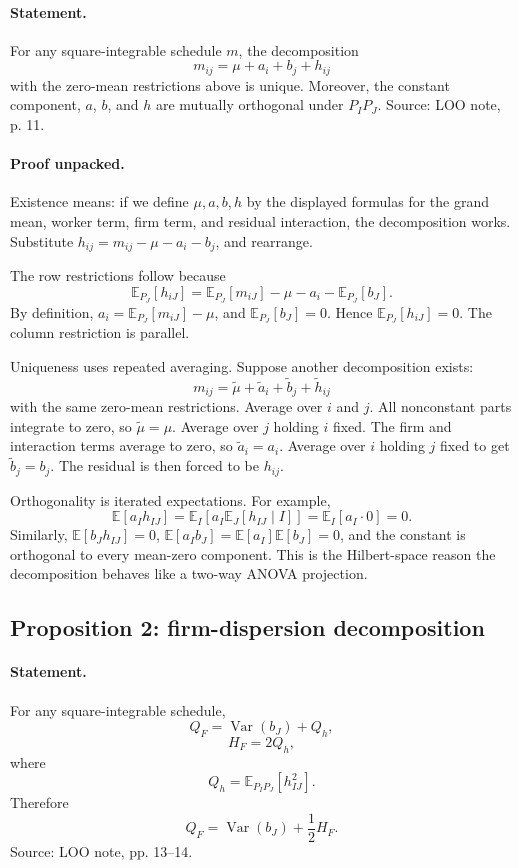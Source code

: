 \documentclass[11pt]{article}
\newcommand{\E}{\mathbb{E}}
\newcommand{\Var}{\operatorname{Var}}
\begin{document}
\paragraph{Statement.}
For any square-integrable schedule \(m\), the decomposition
\[
m_{ij}=\mu+a_i+b_j+h_{ij}
\]
with the zero-mean restrictions above is unique. Moreover, the constant
component, \(a\), \(b\), and \(h\) are mutually orthogonal under \(P_I P_J\).
Source: LOO note, p. 11.

\paragraph{Proof unpacked.}
Existence means: if we define \(\mu,a,b,h\) by the displayed formulas for the
grand mean, worker term, firm term, and residual interaction, the
decomposition works. Substitute \(h_{ij}=m_{ij}-\mu-a_i-b_j\), and rearrange.

The row restrictions follow because
\[
\E_{P_J}[h_{iJ}]
=
\E_{P_J}[m_{iJ}]-\mu-a_i-\E_{P_J}[b_J].
\]
By definition, \(a_i=\E_{P_J}[m_{iJ}]-\mu\), and
\(\E_{P_J}[b_J]=0\). Hence \(\E_{P_J}[h_{iJ}]=0\). The column restriction is
parallel.

Uniqueness uses repeated averaging. Suppose another decomposition exists:
\[
m_{ij}=\tilde\mu+\tilde a_i+\tilde b_j+\tilde h_{ij}
\]
with the same zero-mean restrictions. Average over \(i\) and \(j\). All
nonconstant parts integrate to zero, so \(\tilde\mu=\mu\). Average over \(j\)
holding \(i\) fixed. The firm and interaction terms average to zero, so
\(\tilde a_i=a_i\). Average over \(i\) holding \(j\) fixed to get
\(\tilde b_j=b_j\). The residual is then forced to be \(h_{ij}\).

Orthogonality is iterated expectations. For example,
\[
\E[a_I h_{IJ}]
=
\E_I\left[a_I \E_J[h_{IJ}\mid I]\right]
=
\E_I[a_I\cdot 0]
=0.
\]
Similarly, \(\E[b_J h_{IJ}]=0\), \(\E[a_I b_J]=\E[a_I]\E[b_J]=0\), and the
constant is orthogonal to every mean-zero component. This is the Hilbert-space
reason the decomposition behaves like a two-way ANOVA projection.

\subsection{Proposition 2: firm-dispersion decomposition}

\paragraph{Statement.}
For any square-integrable schedule,
\[
Q_F=\Var(b_J)+Q_h,
\]
\[
H_F=2Q_h,
\]
where
\[
Q_h=\E_{P_I P_J}[h_{IJ}^2].
\]
Therefore
\[
\boxed{Q_F=\Var(b_J)+\frac{1}{2}H_F.}
\]
Source: LOO note, pp. 13--14.
\end{document}
